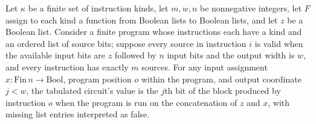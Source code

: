 \begin{theorem}
\label{BoolCircuit.tabCircuit_eval}
\leanok
{}
Let $\kappa$ be a finite set of instruction kinds, let $m,w,n$ be nonnegative integers,
let $F$ assign to each kind a function from Boolean lists to Boolean lists, and let $z$
be a Boolean list. Consider a finite program whose instructions each have a kind and an
ordered list of source bits; suppose every source in instruction $i$ is valid when the
available input bits are $z$ followed by $n$ input bits and the output width is $w$, and
every instruction has exactly $m$ sources. For any input assignment
$x:\mathrm{Fin}\,n\to\mathrm{Bool}$, program position $o$ within the program, and output
coordinate $j<w$, the tabulated circuit's value is the $j$th bit of the block produced
by instruction $o$ when the program is run on the concatenation of $z$ and $x$, with
missing list entries interpreted as false.
\end{theorem}

